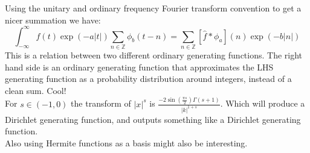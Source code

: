 Using the unitary and ordinary frequency Fourier transform convention to get a nicer summation we have:
\[\int_{-\infty}^{\infty}f(t)\exp(-a|t|)\sum_{n\in\mathbb{Z}}\phi_b(t-n) = \sum_{n\in\mathbb{Z}}[\hat{f}\ast\phi_a](n)\exp(-b|n|)\]
This is a relation between two different ordinary generating functions.
The right hand side is an ordinary generating function that approximates the LHS generating function as a probability distribution around integers, instead of a clean sum. Cool!
\\

For $s \in (-1,0)$ the transform of $|x|^s$  is $\frac{-2\sin(\frac{\pi s}{2})\Gamma(s+1)}{|k|^{1+s}}$.
Which will produce a Dirichlet generating function, and outputs something like a Dirichlet generating function.
\\

Also using Hermite functions as a basis might also be interesting.

